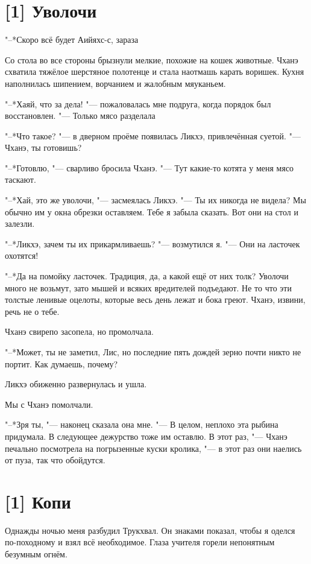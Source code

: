 \section{[1] Уволочи}

"--*Скоро всё будет\ldotst
Аийяхс-с, зараза\ldotse

Со стола во все стороны брызнули мелкие, похожие на кошек животные.
Чханэ схватила тяжёлое шерстяное полотенце и стала наотмашь карать воришек.
Кухня наполнилась шипением, ворчанием и жалобным мяуканьем.

"--*Хаяй, что за дела! "--- пожаловалась мне подруга, когда порядок был восстановлен.
"--- Только мясо разделала\ldotse

"--*Что такое? "--- в дверном проёме появилась Ликхэ, привлечённая суетой.
"--- Чханэ, ты готовишь?

"--*Готовлю, "--- сварливо бросила Чханэ.
"--- Тут какие-то котята у меня мясо таскают.

"--*Хай, это же уволочи, "--- засмеялась Ликхэ.
"--- Ты их никогда не видела?
Мы обычно им у окна обрезки оставляем.
Тебе я забыла сказать.
Вот они на стол и залезли.

"--*Ликхэ, зачем ты их прикармливаешь? "--- возмутился я.
"--- Они на ласточек охотятся!

"--*Да на помойку ласточек.
Традиция, да, а какой ещё от них толк?
Уволочи много не возьмут, зато мышей и всяких вредителей подъедают.
Не то что эти толстые ленивые оцелоты, которые весь день лежат и бока греют.
Чханэ, извини, речь не о тебе.

Чханэ свирепо засопела, но промолчала.

"--*Может, ты не заметил, Лис, но последние пять дождей зерно почти никто не портит.
Как думаешь, почему?

Ликхэ обиженно развернулась и ушла.

Мы с Чханэ помолчали.

"--*Зря ты, "--- наконец сказала она мне.
"--- В целом, неплохо эта рыбина придумала.
В следующее дежурство тоже им оставлю.
В этот раз, "--- Чханэ печально посмотрела на погрызенные куски кролика, "--- в этот раз они наелись от пуза, так что обойдутся.

\section{[1] Копи}

Однажды ночью меня разбудил Трукхвал.
Он знаками показал, чтобы я оделся по-походному и взял всё необходимое.
Глаза учителя горели непонятным безумным огнём.

